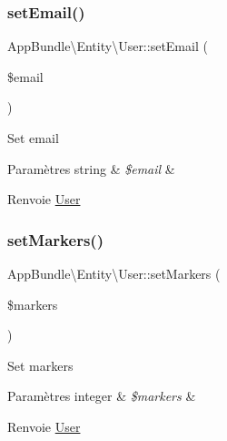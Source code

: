 \subsubsection{\texorpdfstring{set\+Email()}{setEmail()}}
{\footnotesize\ttfamily App\+Bundle\textbackslash{}\+Entity\textbackslash{}\+User\+::set\+Email (\begin{DoxyParamCaption}\item[{}]{\$email }\end{DoxyParamCaption})}

Set email


\begin{DoxyParams}[1]{Paramètres}
string & {\em \$email} & \\
\hline
\end{DoxyParams}
\begin{DoxyReturn}{Renvoie}
\hyperlink{classAppBundle_1_1Entity_1_1User}{User} 
\end{DoxyReturn}
\mbox{\label{classAppBundle_1_1Entity_1_1User_a3eb7c1f0d489635d719d2b31ffa13fb2}} 
\subsubsection{\texorpdfstring{set\+Markers()}{setMarkers()}}
{\footnotesize\ttfamily App\+Bundle\textbackslash{}\+Entity\textbackslash{}\+User\+::set\+Markers (\begin{DoxyParamCaption}\item[{}]{\$markers }\end{DoxyParamCaption})}

Set markers


\begin{DoxyParams}[1]{Paramètres}
integer & {\em \$markers} & \\
\hline
\end{DoxyParams}
\begin{DoxyReturn}{Renvoie}
\hyperlink{classAppBundle_1_1Entity_1_1User}{User} 
\end{DoxyReturn}
\mbox{\label{classAppBundle_1_1Entity_1_1User_aee5056e27aa8e27ca38af6e6373f99e8}} 
